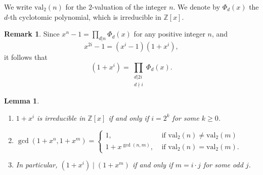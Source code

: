 \documentclass[reqno]{amsart}
\def\val{\mathrm{val}}
\newtheorem{lemma}[theorem]{Lemma}
\theoremstyle{definition}
\newtheorem{remark}{Remark}
\begin{document}
 We write $\val_2(n)$ for the $2$-valuation of the integer $n$. We denote by $\Phi_d(x)$  the $d$-th cyclotomic polynomial, which is irreducible in $\mathbb{Z}[x]$. 
 \begin{remark} \label{rem:phi}
     Since $x^n-1=\prod_{d|n}\Phi_d(x)$ for any positive integer $n$, and \[ x^{2i}-1=(x^i-1)(1+x^i),\]it follows that 
\begin{equation}\label{eq:cycl}(1+x^i)=\prod_{\substack{d|2i \\ d\nmid i}}\Phi_d(x). \end{equation}  \end{remark}
\begin{lemma}\label{lem:elementary_gcd} $ $

    \begin{enumerate}[label=(\alph*)]
    \item \label{onet} $1+x^i$ is irreducible in $\mathbb{Z}[x]$ if and only if $i=2^k$ for some $k\geq 0$.
    \item \label{gcdb} $\gcd(1+x^n,1+x^m)=\begin{cases}
        1, & \textrm{ if } \val_2(n)\neq \val_2(m)\\
        1+x^{\gcd(n,m)},& \textrm{ if } \val_2(n)= \val_2(m).
    \end{cases}$ \\
     \item \label{divb} In particular, $(1+x^i)\mid (1+x^m)$ if and only if $m=i\cdot j$ for some odd $j$.
    \end{enumerate}    
\end{lemma}
\end{document}
